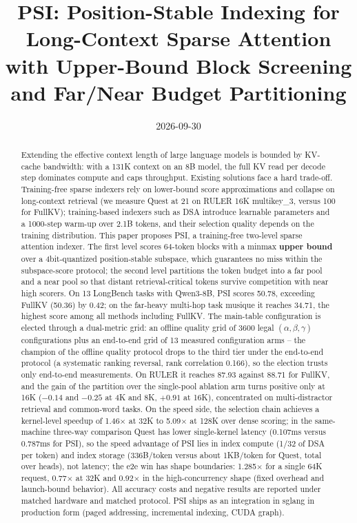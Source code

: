 \documentclass[11pt]{article}
\title{PSI: Position-Stable Indexing for Long-Context Sparse Attention\\
\large with Upper-Bound Block Screening and Far/Near Budget Partitioning}
\date{2026-09-30}
\begin{document}
\maketitle

\begin{abstract}
Extending the effective context length of large language models is bounded by KV-cache bandwidth: with a 131K context on an 8B model, the full KV read per decode step dominates compute and caps throughput. Existing solutions face a hard trade-off. Training-free sparse indexers rely on lower-bound score approximations and collapse on long-context retrieval (we measure Quest at 21 on RULER 16K multikey\_3, versus 100 for FullKV); training-based indexers such as DSA introduce learnable parameters and a 1000-step warm-up over 2.1B tokens, and their selection quality depends on the training distribution. This paper proposes PSI, a training-free two-level sparse attention indexer. The first level scores 64-token blocks with a minmax \textbf{upper bound} over a 4bit-quantized position-stable subspace, which guarantees no miss within the subspace-score protocol; the second level partitions the token budget into a far pool and a near pool so that distant retrieval-critical tokens survive competition with near high scorers. On 13 LongBench tasks with Qwen3-8B, PSI scores 50.78, exceeding FullKV (50.36) by 0.42; on the far-heavy multi-hop task musique it reaches 34.71, the highest score among all methods including FullKV. The main-table configuration is elected through a dual-metric grid: an offline quality grid of 3600 legal $(\alpha,\beta,\gamma)$ configurations plus an end-to-end grid of 13 measured configuration arms -- the champion of the offline quality protocol drops to the third tier under the end-to-end protocol (a systematic ranking reversal, rank correlation 0.166), so the election trusts only end-to-end measurements. On RULER it reaches 87.93 against 88.71 for FullKV, and the gain of the partition over the single-pool ablation arm turns positive only at 16K ($-0.14$ and $-0.25$ at 4K and 8K, $+0.91$ at 16K), concentrated on multi-distractor retrieval and common-word tasks. On the speed side, the selection chain achieves a kernel-level speedup of 1.46$\times$ at 32K to 5.09$\times$ at 128K over dense scoring; in the same-machine three-way comparison Quest has lower single-kernel latency (0.107ms versus 0.787ms for PSI), so the speed advantage of PSI lies in index compute (1/32 of DSA per token) and index storage (336B/token versus about 1KB/token for Quest, total over heads), not latency; the e2e win has shape boundaries: 1.285$\times$ for a single 64K request, 0.77$\times$ at 32K and 0.92$\times$ in the high-concurrency shape (fixed overhead and launch-bound behavior). All accuracy costs and negative results are reported under matched hardware and matched protocol. PSI ships as an integration in sglang in production form (paged addressing, incremental indexing, CUDA graph).

\end{abstract}
\end{document}

